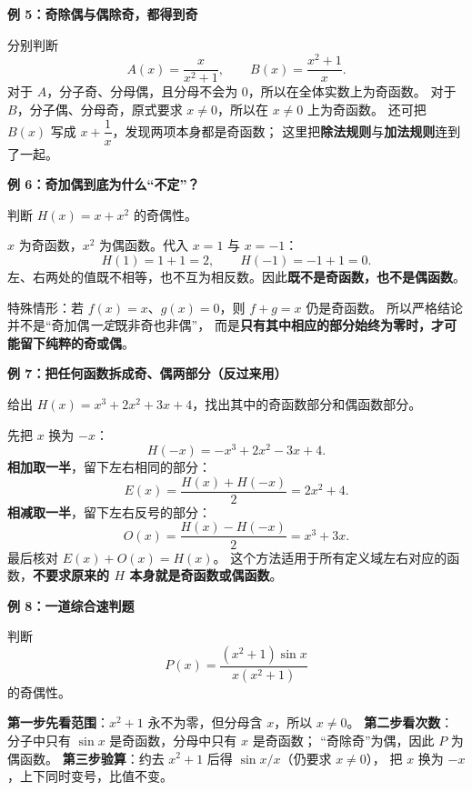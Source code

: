 \clearpage
\begin{examplebox}
\textbf{\textcolor{CExample}{例 5：奇除偶与偶除奇，都得到奇}}



分别判断
\[
A(x)=\frac{x}{x^2+1},\qquad
B(x)=\frac{x^2+1}{x}.
\]
对于 $A$，分子奇、分母偶，且分母不会为 $0$，所以在全体实数上为奇函数。
对于 $B$，分子偶、分母奇，原式要求 $x\ne0$，所以在 $x\ne0$ 上为奇函数。
还可把 $B(x)$ 写成 $x+\dfrac1x$，发现两项本身都是奇函数；
这里把\textbf{除法规则}与\textbf{加法规则}连到了一起。

\medskip

\end{examplebox}
\clearpage
\begin{examplebox}
\textbf{\textcolor{CExample}{例 6：奇加偶到底为什么“不定”？}}



判断 $H(x)=x+x^2$ 的奇偶性。

$x$ 为奇函数，$x^2$ 为偶函数。代入 $x=1$ 与 $x=-1$：
\[
H(1)=1+1=2,\qquad H(-1)=-1+1=0.
\]
左、右两处的值既不相等，也不互为相反数。因此\textbf{既不是奇函数，也不是偶函数}。

特殊情形：若 $f(x)=x$、$g(x)=0$，则 $f+g=x$ 仍是奇函数。
所以严格结论并不是“奇加偶\emph{一定}既非奇也非偶”，
而是\textbf{只有其中相应的部分始终为零时，才可能留下纯粹的奇或偶}。

\medskip

\end{examplebox}
\clearpage
\begin{examplebox}
\textbf{\textcolor{CExample}{例 7：把任何函数拆成奇、偶两部分（反过来用）}}



给出 $H(x)=x^3+2x^2+3x+4$，找出其中的奇函数部分和偶函数部分。

先把 $x$ 换为 $-x$：
\[
H(-x)=-x^3+2x^2-3x+4.
\]
\textbf{相加取一半}，留下左右相同的部分：
\[
E(x)=\frac{H(x)+H(-x)}2=2x^2+4.
\]
\textbf{相减取一半}，留下左右反号的部分：
\[
O(x)=\frac{H(x)-H(-x)}2=x^3+3x.
\]
最后核对 $E(x)+O(x)=H(x)$。
这个方法适用于所有定义域左右对应的函数，\textbf{不要求原来的 $H$ 本身就是奇函数或偶函数}。

\medskip

\end{examplebox}
\clearpage
\begin{examplebox}
\textbf{\textcolor{CExample}{例 8：一道综合速判题}}



判断
\[
P(x)=\frac{(x^2+1)\sin x}{x(x^2+1)}
\]
的奇偶性。

\textbf{第一步先看范围}：$x^2+1$ 永不为零，但分母含 $x$，所以 $x\ne0$。
\textbf{第二步看次数}：分子中只有 $\sin x$ 是奇函数，分母中只有 $x$ 是奇函数；
“奇除奇”为偶，因此 $P$ 为偶函数。
\textbf{第三步验算}：约去 $x^2+1$ 后得 $\sin x/x$（仍要求 $x\ne0$），
把 $x$ 换为 $-x$，上下同时变号，比值不变。
\end{examplebox}
